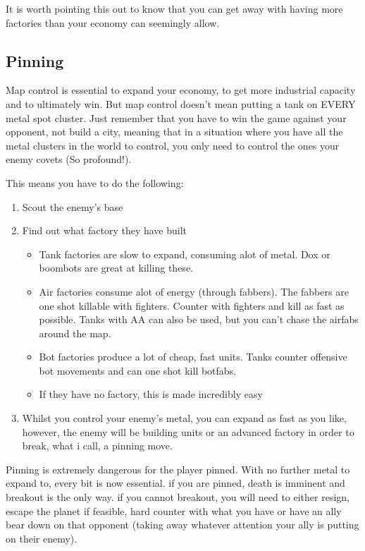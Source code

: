 \documentclass[]{article}
\begin{document}
It is worth pointing this out to know that you can get away with having more factories than your economy can seemingly allow.  

\newpage
\subsection{Pinning}
\label{subsec:pinning}

Map control is essential to expand your economy, to get more industrial capacity and to ultimately win.  But map control doesn't mean putting a tank on EVERY metal spot cluster.  Just remember that you have to win the game against your opponent, not build a city, meaning that in a situation where you have all the metal clusters in the world to control, you only need to control the ones your enemy covets (So profound!).  

This means you have to do the following:

\begin{enumerate}
	\item Scout the enemy's base
	\item Find out what factory they have built
	\begin{itemize}
		\item Tank factories are slow to expand, consuming alot of metal.  Dox or boombots are great at killing these.  
		\item Air factories consume alot of energy (through fabbers).  The fabbers are one shot killable with fighters.  Counter with fighters and kill as fast as possible.  Tanks with AA can also be used, but you can't chase the airfabs around the map.  
		\item Bot factories produce a lot of cheap, fast units.  Tanks counter offensive bot movements and can one shot kill botfabs.  
		\item If they have no factory, this is made incredibly easy
	\end{itemize}
	\item Whilst you control your enemy's metal, you can expand as fast as you like, however, the enemy will be building units or an advanced factory in order to break, what i call, a pinning move.  
	


	
\end{enumerate}
	Pinning is extremely dangerous for the player pinned.  With no further metal to expand to, every bit is now essential.  if you are pinned, death is imminent and breakout is the only way.  if you cannot breakout, you will need to either resign, escape the planet if feasible, hard counter with what you have or have an ally bear down on that opponent (taking away whatever attention your ally is putting on their enemy).  
\end{document}
